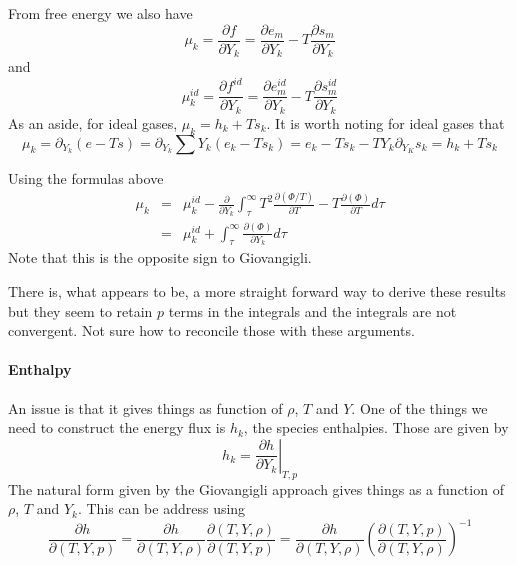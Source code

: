 \documentclass[11pt]{article}
\begin{document}
From free energy we also have
\[
\mu_k = \frac{\partial f}{\partial Y_k} = 
 \frac{\partial e_m}{\partial Y_k} - 
 T\frac{\partial s_m}{\partial Y_k} 
\]
and
\[
\mu_k^{id} = \frac{\partial f^{id}}{\partial Y_k} = 
 \frac{\partial e_m^{id}}{\partial Y_k} - 
 T\frac{\partial s_m^{id}}{\partial Y_k} 
\]
As an aside, for ideal gases, $\mu_k = h_k + T s_k$.  It is worth noting for ideal gases 
that
\[
\mu_k = \partial_{Y_k} (e - T s) = 
 \partial_{Y_k} \sum Y_k(e_k - T s_k) = e_k - T s_k - T Y_k \partial_{Y_K}s_k = h_k + T s_k
\]

Using the formulas above
\begin{eqnarray}
\mu_k &=& \mu_k^{id} - \frac{\partial}{\partial Y_k} \int_\tau^\infty
 T^2 \frac{\partial (\Phi/T)} {\partial T} - T \frac{\partial (\Phi)} {\partial T} d\tau \\
 &=& \mu_k^{id} + \int_\tau^\infty \frac{\partial (\Phi)} {\partial Y_k} d\tau
\end{eqnarray}
Note that this is the opposite sign to Giovangigli.

There is, what appears to be, a more straight forward way to derive these results
but they seem to retain $p$ terms in the integrals
and the integrals are not convergent. Not sure how to reconcile those with these arguments.

%
%
%
\paragraph{Enthalpy}
An issue is that it gives things as function of $\rho$, $T$ and $Y$.  One of the
things we need to construct the energy flux is $h_k$, the species enthalpies.
Those are given by 
\[
h_k = \left. \frac{\partial h}{\partial Y_k} \right|_{T,p}
\]
The natural form given by the Giovangigli approach gives things as a function of $\rho$, $T$ and $Y_k$.
This can be address using
\begin{equation}
\frac{\partial h}{\partial (T,Y,p)}
= \frac{\partial h}{\partial (T,Y,\rho)}
\frac{\partial (T,Y,\rho)}{\partial (T,Y,p)}
= \frac{\partial h}{\partial (T,Y,\rho)}
\left (\frac{\partial (T,Y,p)}{\partial (T,Y,\rho)} \right)^{-1}
\label{eq:calc_cov}
\end{equation}
\end{document}

